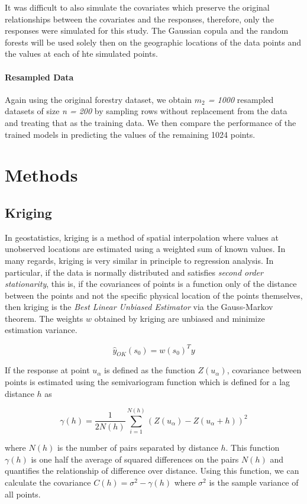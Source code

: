 \documentclass{article}
\begin{document}
It was difficult to also simulate the covariates which preserve the original relationships between the covariates and the responses, therefore, only the responses were simulated for this study.
The Gaussian copula and the random forests will be used solely then on the geographic locations of the data points and the values at each of hte simulated points.

\paragraph{Resampled Data} Again using the original forestry dataset, we obtain \textit{$m_2$ = 1000} resampled datasets of size \textit{n = 200} by sampling rows without replacement from the data and treating that as the training data.
We then compare the performance of the trained models in predicting the values of the remaining 1024 points.

\section{Methods}

\subsection{Kriging}
In geostatistics, kriging is a method of spatial interpolation where values at unobserved locations are estimated using a weighted sum of known values.
In many regards, kriging is very similar in principle to regression analysis.
In particular, if the data is normally distributed and satisfies \textit{second order stationarity}, this is, if the covariances of points is a function only of the distance between the points and not the specific physical location of the points themselves, then kriging is the \textit{Best Linear Unbiased Estimator} via the Gauss-Markov theorem.
The weights $w$ obtained by kriging are unbiased and minimize estimation variance.

$$
\hat{y}_{OK}(s_0) = w(s_0)^T y
$$

If the response at point $u_\alpha$ is defined as the function $Z(u_\alpha)$, covariance between points is estimated using the semivariogram function which is defined for a lag distance $h$ as

$$
\gamma(h) = \frac{1}{2 N(h)} \sum_{i=1}^{N(h)} (Z(u_{\alpha}) - Z(u_{\alpha} + h))^2
$$

where $N(h)$ is the number of pairs separated by distance $h$.
This function $\gamma(h)$ is one half the average of squared differences on the pairs $N(h)$ and quantifies the relationship of difference over distance.
Using this function, we can calculate the covariance $C(h) = \sigma^2 - \gamma(h)$ where $\sigma^2$ is the sample variance of all points.
\end{document}
